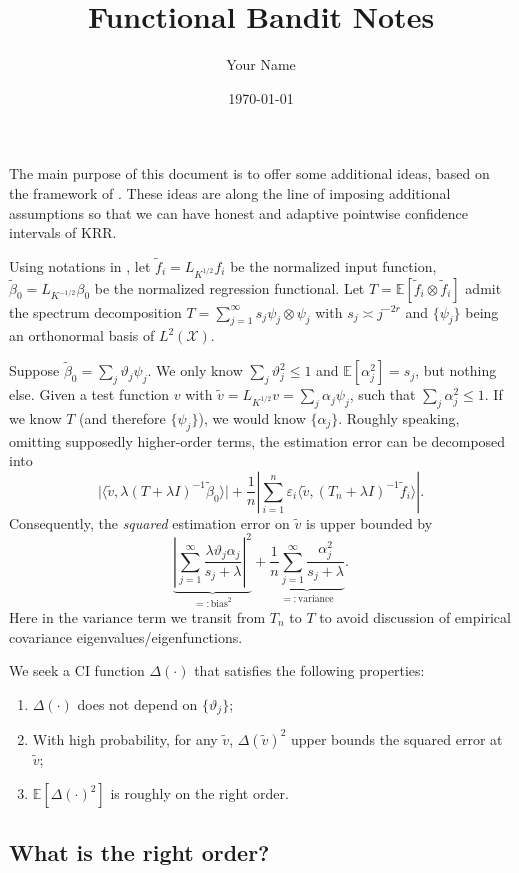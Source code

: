 \documentclass[11pt,a4paper]{article}
\title{Functional Bandit Notes}
\author{Your Name}
\date{\today}
\renewcommand{\tilde}{\widetilde}
\theoremstyle{definition}
\theoremstyle{plain}
\theoremstyle{remark}
\newcommand{\mX}{\mathcal X}
\begin{document}
The main purpose of this document is to offer some additional ideas, based on the framework of \cite{cai2012minimax}.
These ideas are along the line of imposing additional assumptions so that we can have honest and adaptive pointwise confidence intervals of KRR.

Using notations in \cite{cai2012minimax}, let $\tilde f_i=L_{K^{1/2}} f_i$ be the normalized input function, $\tilde\beta_0=L_{K^{-1/2}}\beta_0$
be the normalized regression functional. Let $T=\mathbb E[\tilde f_i\otimes\tilde f_i]$ admit the spectrum decomposition $T=\sum_{j=1}^{\infty}s_j\psi_j\otimes\psi_j$
with $s_j\asymp j^{-2r}$ and $\{\psi_j\}$ being an orthonormal basis of $L^2(\mX)$.

Suppose $\tilde\beta_0=\sum_j \vartheta_j\psi_j$. We only know $\sum_j\vartheta_j^2\leq 1$ and $\mathbb E[\alpha_j^2]=s_j$, but nothing else.
Given a test function $v$ with $\tilde v=L_{K^{1/2}}v = \sum_j\alpha_j\psi_j$, such that $\sum_j\alpha_j^2\leq 1$. If we know $T$ (and therefore $\{\psi_j\}$), we would know $\{\alpha_j\}$.
Roughly speaking, omitting supposedly higher-order terms, the estimation error can be decomposed into
$$
\big|\langle \tilde v, \lambda (T+\lambda I)^{-1}\tilde\beta_0\rangle\big| + \frac{1}{n}\left|\sum_{i=1}^n \varepsilon_i \langle \tilde v, (T_n+\lambda I)^{-1}\tilde f_i\rangle\right|.
$$
Consequently, the \emph{squared} estimation error on $\tilde v$ is upper bounded by 
$$
\underbrace{\left|\sum_{j=1}^{\infty} \frac{\lambda\vartheta_j\alpha_j}{s_j+\lambda}\right|^2}_{=:\text{bias}^2} + \underbrace{\frac{1}{n}\sum_{j=1}^{\infty} \frac{\alpha_j^2}{s_j+\lambda}}_{=:\text{variance}}.
$$
Here in the variance term we transit from $T_n$ to $T$ to avoid discussion of empirical covariance eigenvalues/eigenfunctions.

We seek a CI function $\Delta(\cdot)$ that satisfies the following properties:
\begin{enumerate}
\item $\Delta(\cdot)$ does not depend on $\{\vartheta_j\}$;
\item With high probability, for any $\tilde v$, $\Delta(\tilde v)^2$ upper bounds the squared error at $\tilde v$;
\item $\mathbb E[\Delta(\cdot)^2]$ is roughly on the right order.
\end{enumerate}

\subsection{What is the right order?}
\end{document}
